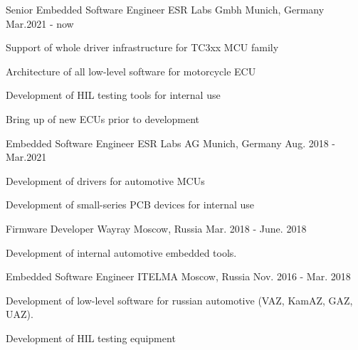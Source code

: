 


\begin{cventries}


\cventry
{Senior Embedded Software Engineer} %
{ESR Labs Gmbh} %
{Munich, Germany} %
{Mar.2021 - now} %
{ %
\begin{cvitems}
\item {Support of whole driver infrastructure for TC3xx MCU family}
\item {Architecture of all low-level software for motorcycle ECU}
\item {Development of HIL testing tools for internal use}
\item {Bring up of new ECUs prior to development}
\end{cvitems}
}

\cventry
{Embedded Software Engineer} %
{ESR Labs AG} %
{Munich, Germany} %
{Aug. 2018 - Mar.2021} %
{ %
\begin{cvitems}
\item {Development of drivers for automotive MCUs}
\item {Development of small-series PCB devices for internal use}
\end{cvitems}
}


\cventry
{Firmware Developer} %
{Wayray} %
{Moscow, Russia} %
{Mar. 2018 - June. 2018} %
{ %
\begin{cvitems}
\item {Development of internal automotive embedded tools.}
\end{cvitems}
}


\cventry
{Embedded Software Engineer} %
{ITELMA} %
{Moscow, Russia} %
{Nov. 2016 - Mar. 2018} %
{ %
\begin{cvitems}
\item {Development of low-level software for russian automotive (VAZ, KamAZ, GAZ, UAZ).}
\item {Development of HIL testing equipment}
\end{cvitems}
}


\end{cventries}